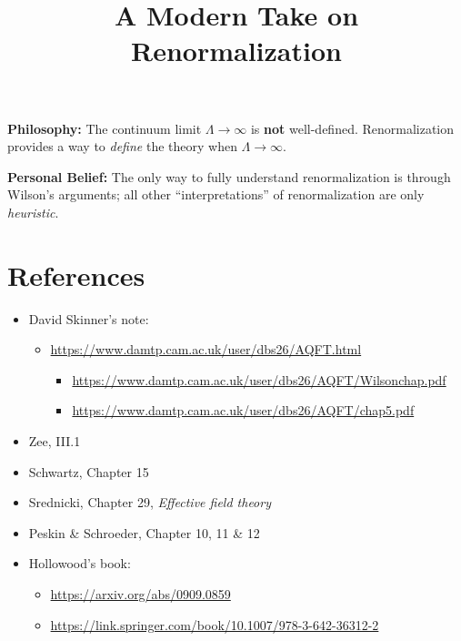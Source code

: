 \documentclass[a4paper
	,10pt
]{article}
\title{A Modern Take on Renormalization}
\begin{document}
\maketitle
{}
\thispagestyle{empty}

\vspace*{-.5\baselineskip}
	\textbf{Philosophy:} The continuum limit $\Lambda\to\infty$ is \textbf{not} well-defined.
	Renormalization provides a way to \emph{define} the theory when
	$\Lambda\to\infty$.
	
	\textbf{Personal Belief:} The only way to fully understand renormalization is
	through Wilson's arguments; all other ``interpretations'' of
	renormalization are only \emph{heuristic}.



\setlength{\parskip}{.1\baselineskip}
\tableofcontents
\setlength{\parskip}{\parskipnorm}

\addtocounter{section}{-1}
\section{References}


	\begin{itemize}[parsep=0pt,itemsep=.5\parskip,labelindent=.1\parindent]
	\item David Skinner's note:
	  \begin{itemize}[nosep]
	  \item \url{https://www.damtp.cam.ac.uk/user/dbs26/AQFT.html}
	    \begin{itemize}[nosep]
	    \item \url{https://www.damtp.cam.ac.uk/user/dbs26/AQFT/Wilsonchap.pdf}
	    \item \url{https://www.damtp.cam.ac.uk/user/dbs26/AQFT/chap5.pdf}
	    \end{itemize}
	  \end{itemize}
	\item Zee, III.1
	\item Schwartz, Chapter 15
	\item Srednicki, Chapter 29, \textit{Effective field theory}
	\item Peskin \& Schroeder, Chapter 10, 11 \& 12
	\item Hollowood's book:
	  \begin{itemize}[nosep]
	  \item \url{https://arxiv.org/abs/0909.0859}
	  \item \url{https://link.springer.com/book/10.1007/978-3-642-36312-2}
	  \end{itemize}
	\end{itemize}
\end{document}

